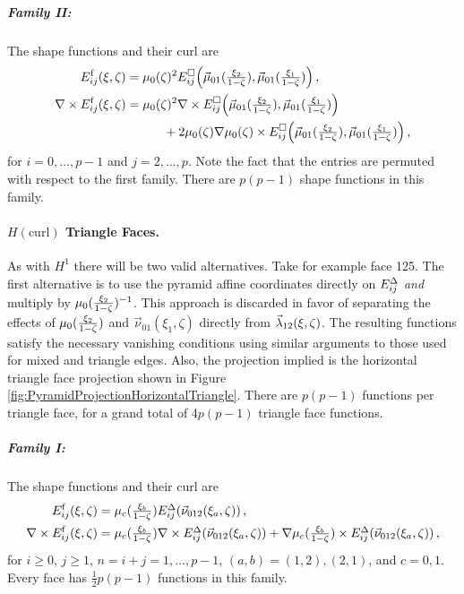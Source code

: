 \subparagraph{Family II:}
The shape functions and their curl are
\begin{equation}
	\begin{aligned}
		E_{ij}^{\mathrm{f}}(\xi,\zeta)&=\mu_0(\zeta)^2 E_{ij}^\square\Big(\vec{\mu}_{01}(\textstyle{\frac{\xi_2}{1-\zeta}}),\vec{\mu}_{01}(\textstyle{\frac{\xi_1}{1-\zeta}})\Big)\,,\\
		\nabla\times E_{ij}^{\mathrm{f}}(\xi,\zeta)&=\mu_0(\zeta)^2\nabla\times
			E_{ij}^\square\Big(\vec{\mu}_{01}(\textstyle{\frac{\xi_2}{1-\zeta}}),\vec{\mu}_{01}(\textstyle{\frac{\xi_1}{1-\zeta}})\Big)\\
				&\qquad\quad+2\mu_0(\zeta)\nabla\mu_0(\zeta)\times E_{ij}^\square\Big(\vec{\mu}_{01}(\textstyle{\frac{\xi_2}{1-\zeta}}),\vec{\mu}_{01}(\textstyle{\frac{\xi_1}{1-\zeta}})\Big)\,,
	\end{aligned}
	\label{eq:PyrHcurlQuadFaceII}
\end{equation}
for $i=0,\ldots,p-1$ and $j=2,\ldots,p$. 
Note the fact that the entries are permuted with respect to the first family.
There are $p(p-1)$ shape functions in this family.

\paragraph{\texorpdfstring{$H(\mathrm{curl})$}{Hcurl} Triangle Faces.} 
As with $H^1$ there will be two valid alternatives.
Take for example face 125.
The first alternative is to use the pyramid affine coordinates directly on $E_{ij}^\Delta$ \textit{and} multiply by $\mu_0(\textstyle{\frac{\xi_2}{1-\zeta}})^{-1}$.
This approach is discarded in favor of separating the effects of $\mu_0(\textstyle{\frac{\xi_2}{1-\zeta}})$ and $\vec{\nu}_{01}(\xi_1,\zeta)$ directly from $\vec{\lambda}_{12}(\xi,\zeta)$.
The resulting functions satisfy the necessary vanishing conditions using similar arguments to those used for mixed and triangle edges.
Also, the projection implied is the horizontal triangle face projection shown in Figure \ref{fig:PyramidProjectionHorizontalTriangle}.
There are $p(p-1)$ functions per triangle face, for a grand total of $4p(p-1)$ triangle face functions.

\subparagraph{Family I:} 
The shape functions and their curl are
\begin{equation}
	\begin{aligned}
		E_{ij}^{\mathrm{f}}(\xi,\zeta)&=\mu_c(\textstyle{\frac{\xi_b}{1-\zeta}})E_{ij}^\Delta(\vec{\nu}_{012}(\xi_a,\zeta))\,,\\
		\nabla\times E_{ij}^{\mathrm{f}}(\xi,\zeta)&=\mu_c(\textstyle{\frac{\xi_b}{1-\zeta}})\nabla\times E_{ij}^\Delta(\vec{\nu}_{012}(\xi_a,\zeta))
			+\nabla\mu_c(\textstyle{\frac{\xi_b}{1-\zeta}})\times E_{ij}^\Delta(\vec{\nu}_{012}(\xi_a,\zeta))\,,
	\end{aligned}
	\label{eq:PyrHcurlTriaFaceI}
\end{equation}
for $i\geq0$, $j\geq1$, $n=i+j=1,\ldots,p-1$, $(a,b)=(1,2),(2,1)$, and $c=0,1$. 
Every face has $\frac{1}{2}p(p-1)$ functions in this family.

